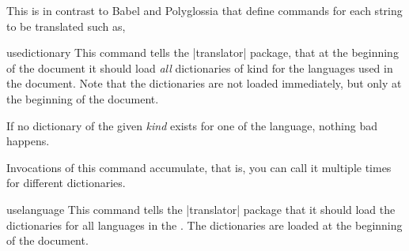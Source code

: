 \begin{teX}

\end{teX} 

This is in contrast to Babel and Polyglossia that define
commands for each string to be translated such as,

\begin{phdverbatim}
\def\captionsdutch{%
    \def\prefacename{Voorwoord}%
    \def\refname{Referenties}%
    \def\abstractname{Samenvatting}%
    \def\bibname{Bibliografie}%
    \def\chaptername{Hoofdstuk}%
    \def\appendixname{Bijlage}%
    ...
    \def\proofname{Bewijs}%
    \def\glossaryname{Verklarende woordenlijst}%
    \def\today{\number\day~\ifcase\month%
      \or januari\or februari\or maart\or april\or mei\or juni\or
      juli\or augustus\or september\or oktober\or november\or
      december\fi
      \space \number\year}}
\end{phdverbatim}

\begin{docCommand}{usedictionary}{}
  This command tells the |translator| package, that at the beginning of
  the document it should load \textit{all} dictionaries of kind  for
  the languages used in the document. Note that the dictionaries are
  not loaded immediately, but only at the beginning of the document.

  If no dictionary of the given \emph{kind} exists for one of the
  language, nothing bad happens.

  Invocations of this command accumulate, that is, you can call it
  multiple times for different dictionaries.
\end{docCommand}

\begin{docCommand}{uselanguage}{}
  This command tells the |translator| package that it should load the
  dictionaries for all languages in the . The
  dictionaries are loaded at the beginning of the document.
\end{docCommand}



